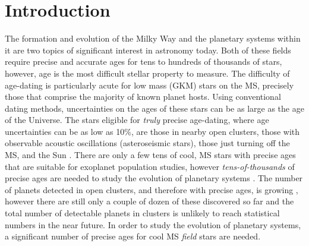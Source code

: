 \section{Introduction}
\label{section:intro}

The formation and evolution of the Milky Way and the planetary systems within
it are two topics of significant interest in astronomy today.
Both of these fields require precise and accurate ages for tens to hundreds of
thousands of stars, however, age is the most difficult stellar property to
measure.
The difficulty of age-dating is particularly acute for low mass (GKM) stars on
the MS, precisely those that comprise the majority of known planet hosts.
Using conventional dating methods, uncertainties on the ages of these stars
can be as large as the age of the Universe.
The stars eligible for {\it truly} precise age-dating, where age uncertainties
can be as low as 10\%, are those in nearby open clusters, those with
observable acoustic oscillations (asteroseismic stars), those just turning off
the MS, and the Sun
\citep[see][for a review of stellar ages]{soderblom2010}.
There are only a few tens of cool, MS stars with precise ages that are
suitable for exoplanet population studies, however {\it tens-of-thousands} of
precise ages are needed to study the evolution of planetary systems
\citep[\eg][]{petigura2013, foreman-mackey2014, veras2015, burke2015}.
The number of planets detected in open clusters, and therefore with precise
ages, is growing \citep[\eg][]{mann2017, rizzuto2018, vanderburg2018,
mann2018}, however there are still only a couple of dozen of these discovered
so far and the total number of detectable planets in clusters is unlikely to
reach statistical numbers in the near future.
In order to study the evolution of planetary systems, a significant number of
precise ages for cool MS {\it field} stars are needed.

